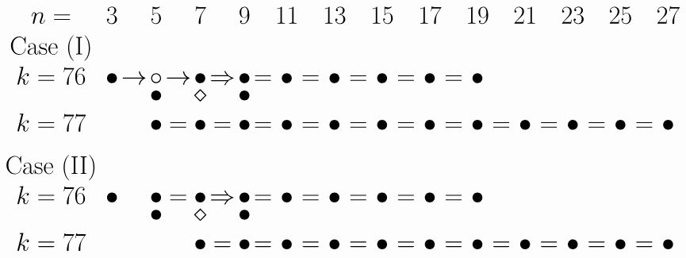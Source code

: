 \documentclass{article}
\begin{document}
\(
\begin{tikzcd}[
nodes={font=\Huge,inner sep=0pt},
row sep=0.2cm,
column sep=0.1cm
]
n= && & 3 & & 5 & & 7 & & 9 & & 11 & & 13 & & 15 & & 17 && 19 && 21 && 23 && 25 && 27 && \\ \\
\text{Case (I)} \\
k=76 &&& \bullet &\rightarrow& \circ &\rightarrow& \bullet &\Rightarrow& \bullet &=& \bullet &=& \bullet  &=& \bullet  &=& \bullet  &=& \bullet \\
&&& && \bullet && \diamond && \bullet \\ \\
k=77 &&& && \bullet &=& \bullet &=& \bullet &=& \bullet &=& \bullet  &=& \bullet  &=& \bullet  &=& \bullet &=& \bullet  &=& \bullet &=& \bullet &=& \bullet \\ \\ \\ \\
\text{Case (II)} \\
k=76 &&& \bullet && \bullet &=& \bullet &\Rightarrow& \bullet &=& \bullet &=& \bullet  &=& \bullet  &=& \bullet  &=& \bullet \\
&&& && \bullet && \diamond && \bullet \\ \\
k=77 &&& && && \bullet &=& \bullet &=& \bullet &=& \bullet  &=& \bullet  &=& \bullet  &=& \bullet &=& \bullet  &=& \bullet &=& \bullet &=& \bullet \\ \\
\\
\end{tikzcd}
\)
\end{document}
